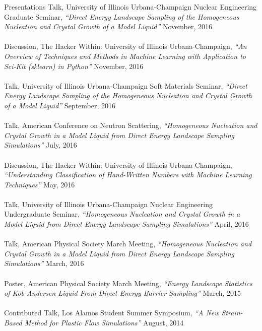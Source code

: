 \documentclass[10pt]{resume} %
\begin{document}
\begin{rSection}{Presentations}
	Talk, University of Illinois Urbana-Champaign Nuclear Engineering Graduate Seminar, {\it{``Direct Energy Landscape Sampling of the Homogeneous Nucleation and Crystal Growth of a Model Liquid''}} \hfill {November, 2016}
	\\
	\\
	Discussion, The Hacker Within: University of Illinois Urbana-Champaign, {\it{``An Overview of Techniques and Methods in Machine Learning with Application to Sci-Kit (sklearn) in Python''}} \hfill {November, 2016}
	\\
	\\
	Talk, University of Illinois Urbana-Champaign Soft Materials Seminar, {\it{``Direct Energy Landscape Sampling of the Homogeneous Nucleation and Crystal Growth of a Model Liquid''}} \hfill {September, 2016}
	\\
	\\
	Talk, American Conference on Neutron Scattering, {\it{``Homogeneous Nucleation and Crystal Growth in a Model Liquid from Direct Energy Landscape Sampling Simulations''}} \hfill {July, 2016}
	\\
	\\
	Discussion, The Hacker Within: University of Illinois Urbana-Champaign, {\it{``Understanding Classification of Hand-Written Numbers with Machine Learning Techniques''}} \hfill {May, 2016}
	\\
	\\
	Talk, University of Illinois Urbana-Champaign Nuclear Engineering Undergraduate Seminar, {\it{``Homogeneous Nucleation and Crystal Growth in a Model Liquid from Direct Energy Landscape Sampling Simulations''}} \hfill {April, 2016} 
	\\
	\\
	Talk, American Physical Society March Meeting, {\it{``Homogeneous Nucleation and Crystal Growth in a Model Liquid from Direct Energy Landscape Sampling Simulations''}} \hfill {March, 2016} \\
	\\
	Poster, American Physical Society March Meeting, {\it{``Energy Landscape Statistics of Kob-Andersen Liquid From Direct Energy Barrier Sampling''}} \hfill {March, 2015} \\
	\\	
	Contributed Talk, Los Alamos Student Summer Symposium, {\it{``A New Strain-Based Method for Plastic Flow Simulations''}} \hfill {August, 2014} \\
\end{rSection}
\end{document}
